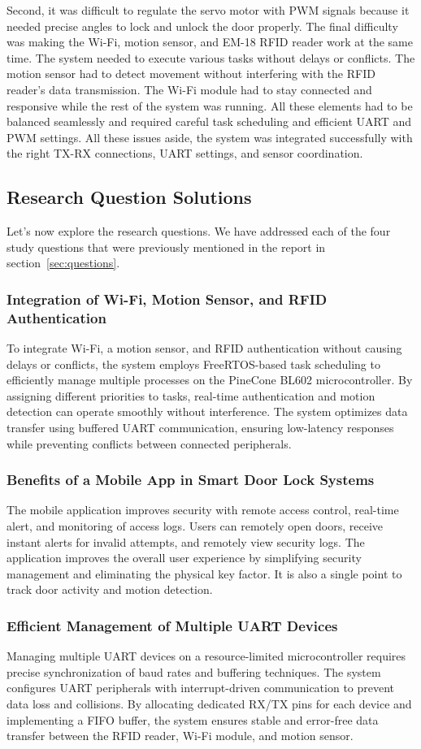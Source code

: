 \documentclass[a4paper]{scrartcl}
\begin{document}
Second, it was difficult to regulate the servo motor with PWM signals because it needed precise angles to lock and unlock the door properly. The final difficulty was making the Wi-Fi, motion sensor, and EM-18 RFID reader work at the same time. The system needed to execute various tasks without delays or conflicts. The motion sensor had to detect movement without interfering with the RFID reader's data transmission. The Wi-Fi module had to stay connected and responsive while the rest of the system was running. All these elements had to be balanced seamlessly and required careful task scheduling and efficient UART and PWM settings. All these issues aside, the system was integrated successfully with the right TX-RX connections, UART settings, and sensor coordination.
\subsection{Research Question Solutions}
Let’s now explore the research questions. We have addressed each of the four study
questions that were previously mentioned in the report in section~\ref{sec:questions}.
\subsubsection{Integration of Wi-Fi, Motion Sensor, and RFID Authentication}
To integrate Wi-Fi, a motion sensor, and RFID authentication without causing delays or conflicts, the system employs FreeRTOS-based task scheduling to efficiently manage multiple processes on the PineCone BL602 microcontroller. By assigning different priorities to tasks, real-time authentication and motion detection can operate smoothly without interference. The system optimizes data transfer using buffered UART communication, ensuring low-latency responses while preventing conflicts between connected peripherals.
\subsubsection{Benefits of a Mobile App in Smart Door Lock Systems}
The mobile application improves security with remote access control, real-time alert, and monitoring of access logs. Users can remotely open doors, receive instant alerts for invalid attempts, and remotely view security logs. The application improves the overall user experience by simplifying security management and eliminating the physical key factor. It is also a single point to track door activity and motion detection.

\subsubsection{Efficient Management of Multiple UART Devices}
Managing multiple UART devices on a resource-limited microcontroller requires precise synchronization of baud rates and buffering techniques. The system configures UART peripherals with interrupt-driven communication to prevent data loss and collisions. By allocating dedicated RX/TX pins for each device and implementing a FIFO buffer, the system ensures stable and error-free data transfer between the RFID reader, Wi-Fi module, and motion sensor.
\end{document}
